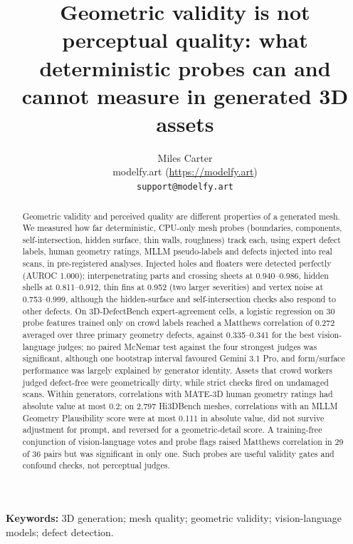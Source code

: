 \documentclass[11pt,a4paper]{article}
\title{Geometric validity is not perceptual quality: what deterministic probes can and cannot measure in generated 3D assets}
\author{Miles Carter\\
modelfy.art (\url{https://modelfy.art})\\
\texttt{support@modelfy.art}}
\date{}
\begin{document}
\maketitle

\begin{abstract}
Geometric validity and perceived quality are different properties of a generated mesh.
We measured how far deterministic, CPU-only mesh probes (boundaries, components, self-intersection, hidden surface, thin walls, roughness) track each, using expert defect labels, human geometry ratings, MLLM pseudo-labels and defects injected into real scans, in pre-registered analyses.
Injected holes and floaters were detected perfectly (AUROC 1.000); interpenetrating parts and crossing sheets at 0.940--0.986, hidden shells at 0.811--0.912, thin fins at 0.952 (two larger severities) and vertex noise at 0.753--0.999, although the hidden-surface and self-intersection checks also respond to other defects.
On 3D-DefectBench expert-agreement cells, a logistic regression on 30 probe features trained only on crowd labels reached a Matthews correlation of 0.272 averaged over three primary geometry defects, against 0.335--0.341 for the best vision-language judges; no paired McNemar test against the four strongest judges was significant, although one bootstrap interval favoured Gemini 3.1 Pro, and form/surface performance was largely explained by generator identity.
Assets that crowd workers judged defect-free were geometrically dirty, while strict checks fired on undamaged scans.
Within generators, correlations with MATE-3D human geometry ratings had absolute value at most 0.2; on 2{,}797 Hi3DBench meshes, correlations with an MLLM Geometry Plausibility score were at most 0.111 in absolute value, did not survive adjustment for prompt, and reversed for a geometric-detail score.
A training-free conjunction of vision-language votes and probe flags raised Matthews correlation in 29 of 36 pairs but was significant in only one.
Such probes are useful validity gates and confound checks, not perceptual judges.
\end{abstract}
\noindent\textbf{Keywords:} 3D generation; mesh quality; geometric validity; vision-language models; defect detection.
\end{document}

